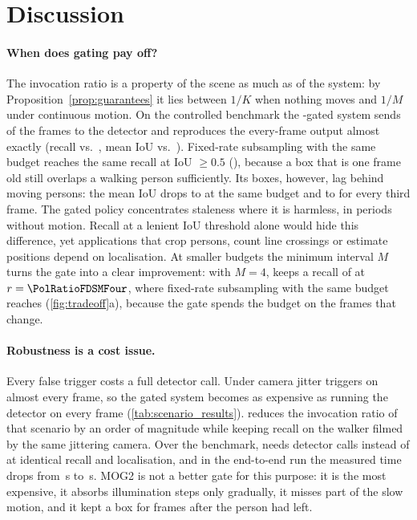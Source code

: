 \section{Discussion}\label{sec:discussion}

\paragraph{When does gating pay off?} The invocation ratio is a property of the scene as much as of the system: by Proposition~\ref{prop:guarantees} it lies between $1/K$ when nothing moves and $1/M$ under continuous motion. On the controlled benchmark the \FDS-gated system sends \PolRatioFDS{} of the frames to the detector and reproduces the every-frame output almost exactly (recall \PolRecallFDS{} vs.\ \PolRecallEvery, mean IoU \PolIouFDS{} vs.\ \PolIouEvery). Fixed-rate subsampling with the same budget reaches the same recall at IoU $\ge0.5$ (\FixedRecallAtFDS), because a box that is one frame old still overlaps a walking person sufficiently. Its boxes, however, lag behind moving persons: the mean IoU drops to \FixedIouAtFDS{} at the same budget and to \PolIouFixedThree{} for every third frame. The gated policy concentrates staleness where it is harmless, in periods without motion. Recall at a lenient IoU threshold alone would hide this difference, yet applications that crop persons, count line crossings or estimate positions depend on localisation. At smaller budgets the minimum interval $M$ turns the gate into a clear improvement: with $M=4$, \FDS{} keeps a recall of \PolRecallFDSMFour{} at $r=\PolRatioFDSMFour$, where fixed-rate subsampling with the same budget reaches \FixedRecallAtFDSMFour{} (\cref{fig:tradeoff}a), because the gate spends the budget on the frames that change.

\paragraph{Robustness is a cost issue.} Every false trigger costs a full detector call. Under camera jitter \FD{} triggers on almost every frame, so the gated system becomes as expensive as running the detector on every frame (\cref{tab:scenario_results}). \FDS{} reduces the invocation ratio of that scenario by an order of magnitude while keeping recall on the walker filmed by the same jittering camera. Over the benchmark, \FDS{} needs \PolCallsFDS{} detector calls instead of \PolCallsFD{} at identical recall and localisation, and in the end-to-end run the measured time drops from \EtoeMeasuredFD\,s to \EtoeMeasuredFDS\,s. MOG2 is not a better gate for this purpose: it is the most expensive, it absorbs illumination steps only gradually, it misses part of the slow motion, and it kept a box for \PolExitMOG{} frames after the person had left.

